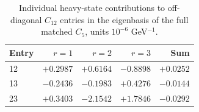 \begin{table}[htbp]
\centering
\caption{Individual heavy-state contributions to off-diagonal $C_{12}$ entries in the eigenbasis of the full matched $C_5$, units $10^{-6}$ GeV$^{-1}$.}
\label{tab:t3-heavy-cancellation}
\begin{tabular}{lrrrr}
\toprule
Entry & $r=1$ & $r=2$ & $r=3$ & Sum \\
\midrule
12 & $+0.2987$ & $+0.6164$ & $-0.8898$ & $+0.0252$ \\
13 & $-0.2436$ & $-0.1983$ & $+0.4276$ & $-0.0144$ \\
23 & $+0.3403$ & $-2.1542$ & $+1.7846$ & $-0.0292$ \\
\bottomrule
\end{tabular}
\end{table}
